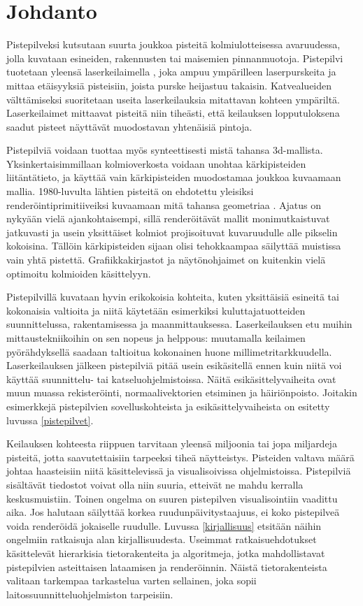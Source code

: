 \section{Johdanto}

Pistepilveksi kutsutaan suurta joukkoa pisteitä kolmiulotteisessa avaruudessa, jolla kuvataan esineiden, rakennusten tai maisemien pinnanmuotoja. Pistepilvi tuotetaan yleensä laserkeilaimella , joka ampuu ympärilleen laserpurskeita ja mittaa etäisyyksiä pisteisiin, joista purske heijastuu takaisin. Katvealueiden välttämiseksi suoritetaan useita laserkeilauksia mitattavan kohteen ympäriltä. Laserkeilaimet mittaavat pisteitä niin tiheästi, että keilauksen lopputuloksena saadut pisteet näyttävät muodostavan yhtenäisiä pintoja. 

Pistepilviä voidaan tuottaa myös synteettisesti mistä tahansa 3d-mallista. Yksinkertaisimmillaan kolmioverkosta voidaan unohtaa kärkipisteiden liitäntätieto, ja käyttää vain kärkipisteiden muodostamaa joukkoa kuvaamaan mallia. 1980-luvulta lähtien pisteitä on ehdotettu yleisiksi renderöintiprimitiiveiksi kuvaamaan mitä tahansa geometriaa \cite{Whitted}. Ajatus on nykyään vielä ajankohtaisempi, sillä renderöitävät mallit monimutkaistuvat jatkuvasti ja usein yksittäiset kolmiot projisoituvat kuvaruudulle alle pikselin kokoisina. Tällöin kärkipisteiden sijaan olisi tehokkaampaa säilyttää muistissa vain yhtä pistettä. Grafiikkakirjastot ja näytönohjaimet on kuitenkin vielä optimoitu kolmioiden käsittelyyn.

Pistepilvillä kuvataan hyvin erikokoisia kohteita, kuten yksittäisiä esineitä tai kokonaisia valtioita ja niitä käytetään esimerkiksi kuluttajatuotteiden suunnittelussa, rakentamisessa ja maanmittauksessa. Laserkeilauksen etu muihin mittaustekniikoihin on sen nopeus ja helppous: muutamalla keilaimen pyörähdyksellä saadaan taltioitua kokonainen huone millimetritarkkuudella. Laserkeilauksen jälkeen pistepilviä pitää usein esikäsitellä ennen kuin niitä voi käyttää suunnittelu- tai katseluohjelmistoissa. Näitä esikäsittelyvaiheita ovat muun muassa rekisteröinti, normaalivektorien etsiminen ja häiriönpoisto. Joitakin esimerkkejä pistepilvien sovelluskohteista ja esikäsittelyvaiheista on esitetty luvussa \ref{pistepilvet}.

Keilauksen kohteesta riippuen tarvitaan yleensä miljoonia tai jopa miljardeja pisteitä, jotta saavutettaisiin tarpeeksi tiheä näytteistys. Pisteiden valtava määrä johtaa haasteisiin niitä käsittelevissä ja visualisoivissa ohjelmistoissa. Pistepilviä sisältävät tiedostot voivat olla niin suuria, etteivät ne mahdu kerralla keskusmuistiin. Toinen ongelma on suuren pistepilven visualisointiin vaadittu aika. Jos halutaan säilyttää korkea ruudunpäivitystaajuus, ei koko pistepilveä voida renderöidä jokaiselle ruudulle. Luvussa \ref{kirjallisuus} etsitään näihin ongelmiin ratkaisuja alan kirjallisuudesta. Useimmat ratkaisuehdotukset käsittelevät hierarkisia tietorakenteita ja algoritmeja, jotka mahdollistavat pistepilvien asteittaisen lataamisen ja renderöinnin. Näistä tietorakenteista valitaan tarkempaa tarkastelua varten sellainen, joka sopii laitossuunnitteluohjelmiston tarpeisiin. 


